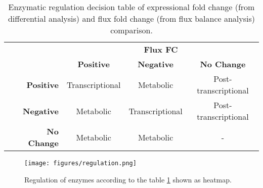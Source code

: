 \baselineskip
\begin{table}[H]
\begin{center}
\caption[Enzymatic regulation decision table of expressional fold change (from differential analysis) and flux fold change (from flux balance analysis) comparison.]{Enzymatic regulation decision table \cite{bordel2010sampling} of expressional fold change (from differential analysis) and flux fold change (from flux balance analysis) comparison.}
\baselineskip
\label{table:regulation_table}

\begin{tabular}{lrccc}
                                                                         & \multicolumn{1}{l}{}                    & \multicolumn{3}{c}{\textbf{Flux FC}}                                                                          \\ \cline{3-5}
                                                                         & \multicolumn{1}{c}{\textbf{}}           & \textbf{Positive}                    & \textbf{Negative}                    & \textbf{No Change}                        \\ \cline{3-5}
\multicolumn{1}{l|}{\parbox[t]{3mm}{}} & \multicolumn{1}{r|}{\textbf{Positive}}  & \multicolumn{1}{c|}{Transcriptional} & \multicolumn{1}{c|}{Metabolic}       & \multicolumn{1}{c|}{Post-transcriptional} \\ \cline{3-5}
\multicolumn{1}{l|}{}                                                    & \multicolumn{1}{r|}{\textbf{Negative}}  & \multicolumn{1}{c|}{Metabolic}       & \multicolumn{1}{c|}{Transcriptional} & \multicolumn{1}{c|}{Post-transcriptional} \\ \cline{3-5}
\multicolumn{1}{l|}{}                                                    & \multicolumn{1}{r|}{\textbf{No Change}} & \multicolumn{1}{c|}{Metabolic}       & \multicolumn{1}{c|}{Metabolic}       & \multicolumn{1}{c|}{-}                    \\ \cline{3-5}
\end{tabular}
\end{center}
\end{table}

\begin{figure}[H]
  \begin{center}
  \texttt{[image: figures/regulation.png]}
  \caption[Regulation of enzymes according to decision table shown as heatmap.]{Regulation of enzymes according to the table \ref{table:regulation_table} shown as heatmap.}
  \label{fig:fba_regulation3}
  \end{center}
\end{figure}

